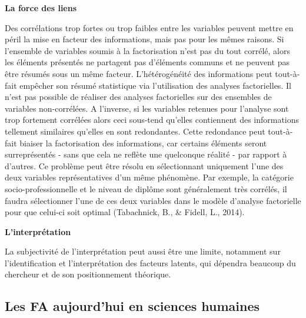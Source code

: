 \documentclass[
  french,
  11pt,
  a4paper,
]{article}
\begin{document}
\textbf{La force des liens}

Des corrélations trop fortes ou trop faibles entre les variables peuvent
mettre en péril la mise en facteur des informations, mais pas pour les
mêmes raisons. Si l'ensemble de variables soumis à la factorisation
n'est pas du tout corrélé, alors les éléments présentés ne partagent pas
d'éléments communs et ne peuvent pas être résumés sous un même facteur.
L'hétérogénéité des informations peut tout-à-fait empêcher son résumé
statistique via l'utilisation des analyses factorielles. Il n'est pas
possible de réaliser des analyses factorielles sur des ensembles de
variables non-corrélées. A l'inverse, si les variables retenues pour
l'analyse sont trop fortement corrélées alors ceci sous-tend qu'elles
contiennent des informations tellement similaires qu'elles en sont
redondantes. Cette redondance peut tout-à-fait biaiser la factorisation
des informations, car certains éléments seront surreprésentés - sans que
cela ne reflète une quelconque réalité - par rapport à d'autres. Ce
problème peut être résolu en sélectionnant uniquement l'une des deux
variables représentatives d'un même phénomène. Par exemple, la catégorie
socio-professionnelle et le niveau de diplôme sont généralement très
corrélés, il faudra sélectionner l'une de ces deux variables dans le
modèle d'analyse factorielle pour que celui-ci soit optimal (Tabachnick,
B., \& Fidell, L., 2014).

\textbf{L'interprétation}

La subjectivité de l'interprétation peut aussi être une limite,
notamment sur l'identification et l'interprétation des facteurs latents,
qui dépendra beaucoup du chercheur et de son positionnement théorique.

\subsection{Les FA aujourd'hui en sciences
humaines}\label{les-fa-aujourdhui-en-sciences-humaines}
\end{document}
